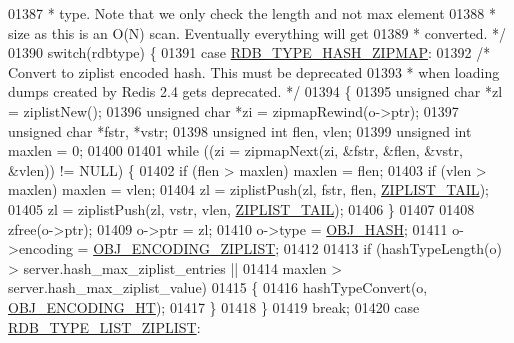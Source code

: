 \begin{DoxyCode}
{{{{{{{{{{{{{{{{{{{{{{{01387 \textcolor{comment}{         * type. Note that we only check the length and not max element}
01388 \textcolor{comment}{         * size as this is an O(N) scan. Eventually everything will get}
01389 \textcolor{comment}{         * converted. */}
01390         \textcolor{keywordflow}{switch}(rdbtype) \{
01391             \textcolor{keywordflow}{case} \hyperlink{rdb_8h_ada37d3f42c37fc3b8894f5c541df5033}{RDB\_TYPE\_HASH\_ZIPMAP}:
01392                 \textcolor{comment}{/* Convert to ziplist encoded hash. This must be deprecated}
01393 \textcolor{comment}{                 * when loading dumps created by Redis 2.4 gets deprecated. */}
01394                 \{
01395                     \textcolor{keywordtype}{unsigned} \textcolor{keywordtype}{char} *zl = ziplistNew();
01396                     \textcolor{keywordtype}{unsigned} \textcolor{keywordtype}{char} *zi = zipmapRewind(o->ptr);
01397                     \textcolor{keywordtype}{unsigned} \textcolor{keywordtype}{char} *fstr, *vstr;
01398                     \textcolor{keywordtype}{unsigned} \textcolor{keywordtype}{int} flen, vlen;
01399                     \textcolor{keywordtype}{unsigned} \textcolor{keywordtype}{int} maxlen = 0;
01400 
01401                     \textcolor{keywordflow}{while} ((zi = zipmapNext(zi, &fstr, &flen, &vstr, &vlen)) != NULL) \{
01402                         \textcolor{keywordflow}{if} (flen > maxlen) maxlen = flen;
01403                         \textcolor{keywordflow}{if} (vlen > maxlen) maxlen = vlen;
01404                         zl = ziplistPush(zl, fstr, flen, \hyperlink{ziplist_8h_a25d058a2c2c0db0f131f84d23ede6ba2}{ZIPLIST\_TAIL});
01405                         zl = ziplistPush(zl, vstr, vlen, \hyperlink{ziplist_8h_a25d058a2c2c0db0f131f84d23ede6ba2}{ZIPLIST\_TAIL});
01406                     \}
01407 
01408                     zfree(o->ptr);
01409                     o->ptr = zl;
01410                     o->type = \hyperlink{server_8h_a87c05ba4f7f36741864277f02a4423fb}{OBJ\_HASH};
01411                     o->encoding = \hyperlink{server_8h_aabf064ede983103f1fd0df2086e84eee}{OBJ\_ENCODING\_ZIPLIST};
01412 
01413                     \textcolor{keywordflow}{if} (hashTypeLength(o) > server.hash\_max\_ziplist\_entries ||
01414                         maxlen > server.hash\_max\_ziplist\_value)
01415                     \{
01416                         hashTypeConvert(o, \hyperlink{server_8h_a9c10219f68afc557d510d108257d238b}{OBJ\_ENCODING\_HT});
01417                     \}
01418                 \}
01419                 \textcolor{keywordflow}{break};
01420             \textcolor{keywordflow}{case} \hyperlink{rdb_8h_a404cb257f5c3d725f89417ba4f0142c5}{RDB\_TYPE\_LIST\_ZIPLIST}:
}}}}}}}}}}}}}}}}}}}}}}}
\end{DoxyCode}
